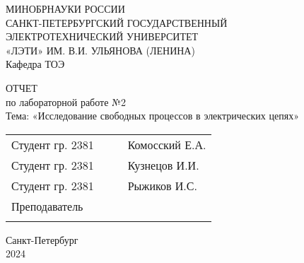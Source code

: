 \clearpage
\begin{center}
	МИНОБРНАУКИ РОССИИ\\
	САНКТ-ПЕТЕРБУРГСКИЙ ГОСУДАРСТВЕННЫЙ\\
	ЭЛЕКТРОТЕХНИЧЕСКИЙ УНИВЕРСИТЕТ\\
	«ЛЭТИ» ИМ. В.И. УЛЬЯНОВА (ЛЕНИНА)\\
	Кафедра ТОЭ
	\vspace{54mm}

	ОТЧЕТ\\
	по лабораторной работе №2 \\
	Тема: «Исследование свободных процессов в электрических цепях» \\




	\vfill
	\def\arraystretch{1.5}
	\begin{tabularx}{\textwidth}{ >{\hsize=7cm}X >{\hsize=4cm}X >{\hsize=1mm}X >{\centering\arraybackslash}X }
		Студент гр. 2381 &  &  & Комосский Е.А. \\
		Студент гр. 2381 &  &  & Кузнецов И.И.  \\
		Студент гр. 2381 &  &  & Рыжиков И.С.   \\
		Преподаватель    &  &  &                \\ \cline{2-2} \cline{4-4}
	\end{tabularx}
	\def\arraystretch{1}

	\vspace{25mm}

	Санкт-Петербург\\
	2024
\end{center}
\newpage
